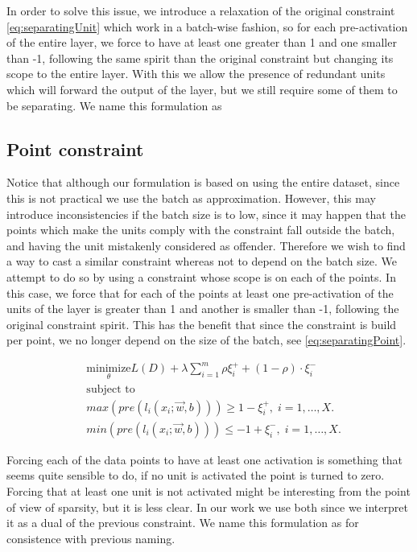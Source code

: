 In order to solve this issue, we introduce a relaxation of the original constraint \ref{eq:separatingUnit} which work in a batch-wise fashion, so for each pre-activation of the entire layer, we force to have at least one greater than 1 and one smaller than -1, following the same spirit than the original constraint but changing its scope to the entire layer. With this we allow the presence of redundant units which will forward the output of the layer, but we still require some of them to be separating. We name this formulation as \SepLayer

\subsection{Point constraint}

Notice that although our formulation is based on using the entire dataset, since this is not practical we use the batch as approximation. However, this may introduce inconsistencies if the batch size is to low, since it may happen that the points which make the units comply with the constraint fall outside the batch, and having the unit mistakenly considered as offender. Therefore we wish to find a way to cast a similar constraint whereas not to depend on the batch size. We attempt to do so by using a constraint whose scope is on each of the points. In this case, we force that for each of the points at least one pre-activation of the units of the layer is greater than 1 and another is smaller than -1, following the original constraint spirit. This has the benefit that since the constraint is build per point, we no longer depend on the size of the batch, see \ref{eq:separatingPoint}. 

\begin{equation}\label{eq:separatingPoint}
\begin{aligned}
&\underset{\theta}{\text{minimize}}   L(D) + \lambda\sum^m_{i=1} \rho \xi^+_i+(1-\rho) \cdot \xi^-_i\\
& \text{subject to}\\
&  max(pre(l_i(x_i;\vec{w},b))) \geq 1 - \xi^+_i, \; i = 1, \ldots, X.\\
&  min(pre(l_i(x_i;\vec{w},b)))\leq -1 + \xi^-_i, \; i = 1, \ldots, X.
\end{aligned}
\end{equation}

Forcing each of the data points to have at least one activation is something that seems quite sensible to do, if no unit is activated the point is turned to zero. Forcing that at least one unit is not activated might be interesting from the point of view of sparsity, but it is less clear. In our work we use both since we interpret it as a dual of the previous constraint. We name this formulation as \SepPoint for consistence with previous naming.